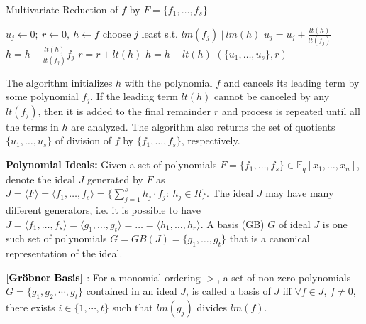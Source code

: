 \begin{algorithm}[H]
 \caption{Multivariate Reduction of $f$ by $F=\{f_1,\dots,f_s\}$}
 \label{algo:mv_reduce}
 \begin{algorithmic}[1]
 \State $u_j \gets 0; ~r \gets 0, ~h \gets f $ 
 \State choose $j$ least s.t. $lm(f_j) ~|~ lm(h)$
 \State $u_j = u_j + \frac{lt(h)}{lt(f_j)}$
 \State $h = h - \frac{lt(h)}{lt(f_j)} f_j$
 \Else
 \State $r = r+ lt(h)$
 \State $h = h - lt(h)$
 \EndIf
 \EndWhile
 \State \Return $(\{u_1,\dots,u_s\} , r)$
 \EndProcedure
 \end{algorithmic}
 \end{algorithm}

The algorithm initializes $h$ with the polynomial $f$ and cancels its leading term by some 
polynomial $f_j$. If the leading term $lt(h)$ cannot be canceled by any $lt(f_j)$, then it is added to the 
final remainder $r$ and process is repeated until all the terms in $h$ are analyzed. 
The algorithm also returns the set of quotients $\{u_1,\dots,u_s\}$ of division of $f$ by 
$\{f_1,\dots,f_s\}$, respectively. 

{\bf Polynomial Ideals:} Given a set of polynomials $F = \{f_1, 
\dots, f_s\}\in \mathbb{F}_q[x_1,\dots, x_n]$, denote the ideal
$J$ generated by $F$ as $J = \langle F \rangle = \langle f_1, \dots, f_s \rangle =
\{\sum_{j=1}^{s} h_j\cdot f_j: ~h_j \in R\}.$ The ideal $J$ may have
many different generators, i.e. it is possible to have 
$J = \langle f_1, \dots, f_s\rangle = \langle g_1, \dots, g_t \rangle
= \dots = \langle h_1,\dots, h_r\rangle$. A \Grobner basis (GB) $G$ of ideal
$J$ is one such set of polynomials $G = GB(J) = \{g_1, \dots, g_t\}$
that is a canonical representation of the ideal. 

\begin{Definition}
\label{def:gb}
$\bf{\left[Gr\ddot{o}bner\ Basis\right]}$ \cite{gb_book}: 
For a monomial ordering $>$, a set  of non-zero polynomials $G =
\{g_1,g_2,\cdots,g_t\}$ contained in an ideal $J$, is called a
\Grobner basis of $J$ iff 
$\forall f \in J$, $f\neq 0$, there exists $i \in \{1,\cdots, t\}$ such
that $lm(g_j)$ divides $lm(f)$.
\end{Definition}


